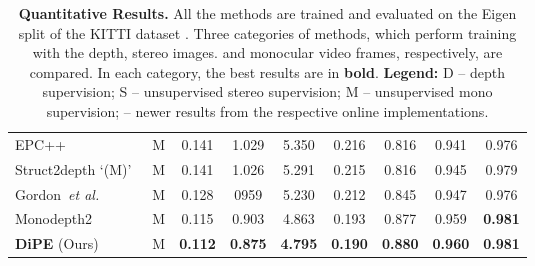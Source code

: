 \documentclass[letterpaper, 10 pt, conference]{ieeeconf}
\def\etal{\emph{et al.}}
\begin{document}
\begin{table*}[t]
{\begin{tabular}{l|c|cccc|ccc}
EPC++~\cite{luo2019every} & M & 0.141 & 1.029 & 5.350 & 0.216 & 0.816 & 0.941 & 0.976\\
Struct2depth `(M)'~\cite{casser2019struct2depth}  & M & 0.141 & {1.026} & 5.291 &  0.215 & 0.816 & 0.945 & {0.979}\\
Gordon~\etal \cite{Gordon_2019_ICCV} & M & 0.128 & 0959 & 5.230 &  0.212 & 0.845 & 0.947 & {0.976}\\
Monodepth2~\cite{godard2019digging} & M & {0.115} & {0.903} & {4.863} &  {0.193} &   {0.877} & {0.959} &   {\bf  0.981} \\ 
\textbf{DiPE} (Ours) & M &   
 {\bf 0.112} &   {\bf 0.875} &   {\bf 4.795} &   {\bf 0.190} &   {\bf 0.880} &   {\bf 0.960} &   {\bf 0.981} \\ 
  \bottomrule
  \end{tabular}
  }
\caption{\textbf{Quantitative Results.} All the methods are trained and evaluated on the Eigen split \cite{eigen2014depth} of the KITTI dataset \cite{geiger2013vision}. Three categories of methods, which perform training with the depth, stereo images. and monocular video frames, respectively, are compared. In each category, the best results are in \textbf{bold}. \textbf{Legend:} D -- depth supervision; S -- unsupervised stereo supervision; M -- unsupervised mono supervision; \textdagger -- newer results from the respective online implementations. }
\label{tab:kitti_eigen}
\end{table*}
\end{document}
